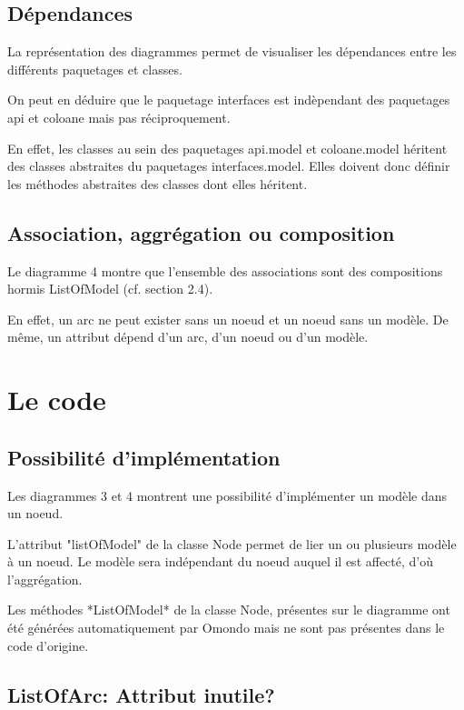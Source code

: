 \documentclass{article}
\begin{document}
\subsection{D\'ependances}

La repr\'esentation des diagrammes permet de visualiser les d\'ependances entre les diff\'erents paquetages et classes.

On peut en d\'eduire que le paquetage interfaces est ind\`ependant des paquetages api et coloane mais pas r\'eciproquement.

En effet, les classes au sein des paquetages api.model et coloane.model héritent des classes abstraites du paquetages interfaces.model.
Elles doivent donc d\'efinir les m\'ethodes abstraites des classes dont elles h\'eritent.



\subsection{Association, aggr\'egation ou composition}

Le diagramme 4 montre que l'ensemble des associations sont des compositions hormis ListOfModel (cf. section 2.4).

En effet, un arc ne peut exister sans un noeud et un noeud sans un mod\`ele.
De m\^eme, un attribut d\'epend d'un arc, d'un noeud ou d'un mod\`ele.


\section{Le code}
\subsection{Possibilit\'e d'impl\'ementation}

Les diagrammes 3 et 4 montrent une possibilit\'e d'impl\'ementer un mod\`ele dans un noeud.

L'attribut "listOfModel" de la classe Node permet de lier un ou plusieurs mod\`ele \`a un noeud.
Le mod\`ele sera ind\'ependant du noeud auquel il est affect\'e, d'o\`u l'aggr\'egation.	

Les m\'ethodes *ListOfModel* de la classe Node, pr\'esentes sur le diagramme ont \'et\'e g\'en\'er\'ees automatiquement par Omondo mais ne sont pas pr\'esentes dans le code d'origine.



\subsection{ListOfArc: Attribut inutile?}
\end{document}
